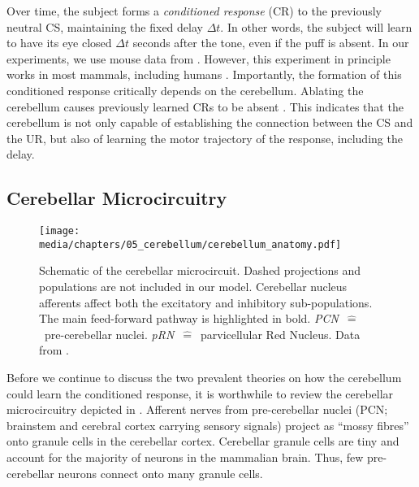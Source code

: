 Over time, the subject forms a \emph{conditioned response} (CR) to the previously neutral CS, maintaining the fixed delay $\Delta t$. In other words, the subject will learn to have its eye closed $\Delta t$ seconds after the tone, even if the puff is absent.
In our experiments, we use mouse data from \citet{heiney2014cerebellardependent}.
However, this experiment in principle works in most mammals, including humans \citep{cheng2008neural}.
Importantly, the formation of this conditioned response critically depends on the cerebellum.
Ablating the cerebellum causes previously learned CRs to be absent \citep{mccormick1981engram}.
This indicates that the cerebellum is not only capable of establishing the connection between the CS and the UR, but also of learning the motor trajectory of the response, including the delay.

\subsection{Cerebellar Microcircuitry}
\label{sec:cerebellum_microcircuit}

\begin{figure}[t]
	\centering
	\texttt{[image: media/chapters/05\_cerebellum/cerebellum\_anatomy.pdf]}
	\caption[Schematic of the cerebellar microcircuit.]{Schematic of the cerebellar microcircuit. Dashed projections and populations are not included in our model. Cerebellar nucleus afferents affect both the excitatory and inhibitory sub-populations.  The main feed-forward pathway is highlighted in bold. \emph{PCN}~$\hat=$~pre-cerebellar nuclei. \emph{pRN}~$\hat=$~parvicellular Red Nucleus. Data from \citet{ito2010cerebellar,llinas2010olivocerebellar}.}
	\vspace*{-0.5em}
	\label{fig:cerebellum_anatomy}
\end{figure}

Before we continue to discuss the two prevalent theories on how the cerebellum could learn the conditioned response, it is worthwhile to review the cerebellar microcircuitry depicted in .
Afferent nerves from pre-cerebellar nuclei (PCN; brainstem and cerebral cortex carrying sensory signals) project as \enquote{mossy fibres} onto granule cells in the cerebellar cortex.
Cerebellar granule cells are tiny and account for the majority of neurons in the mammalian brain.
Thus, few pre-cerebellar neurons connect onto many granule cells.


